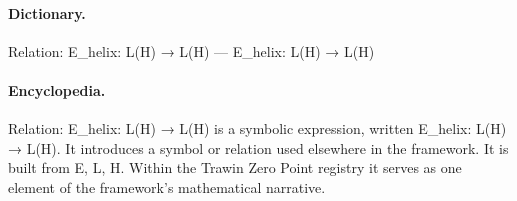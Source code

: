 \paragraph{Dictionary.}
Relation: E\_helix: L(H) → L(H) — E\_helix: L(H) → L(H)

\paragraph{Encyclopedia.}
Relation: E\_helix: L(H) → L(H) is a symbolic expression, written E\_helix: L(H) → L(H). It introduces a symbol or relation used elsewhere in the framework. It is built from E, L, H. Within the Trawin Zero Point registry it serves as one element of the framework's mathematical narrative.
